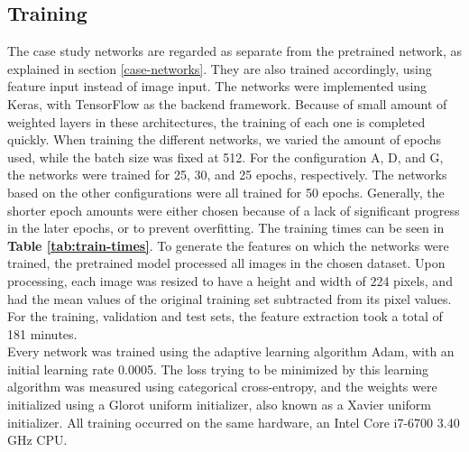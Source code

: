 
\subsection{Training} \label{case-training}



The case study networks are regarded as separate from the pretrained network, as explained in section \ref{case-networks}. They are also trained accordingly, using feature input instead of image input. The networks were implemented using Keras, with TensorFlow as the backend framework. Because of small amount of weighted layers in these architectures, the training of each one is completed quickly. When training the different networks, we varied the amount of epochs used, while the batch size was fixed at 512. For the configuration A, D, and G, the networks were trained for 25, 30, and 25 epochs, respectively. The networks based on the other configurations were all trained for 50 epochs. Generally, the shorter epoch amounts were either chosen because of a lack of significant progress in the later epochs, or to prevent overfitting. The training times can be seen in \textbf{Table \ref{tab:train-times}}. To generate the features on which the networks were trained, the pretrained model processed all images in the chosen dataset. Upon processing, each image was resized to have a height and width of 224 pixels, and had the mean values of the original training set subtracted from its pixel values. For the training, validation and test sets, the feature extraction took a total of 181 minutes. \\

\noindent Every network was trained using the adaptive learning algorithm Adam, with an initial learning rate 0.0005. The loss trying to be minimized by this learning algorithm was measured using categorical cross-entropy, and the weights were initialized using a Glorot uniform initializer, also known as a Xavier uniform initializer. All training occurred on the same hardware, an Intel\textregistered{} Core\texttrademark{} i7-6700 3.40 GHz CPU. 



